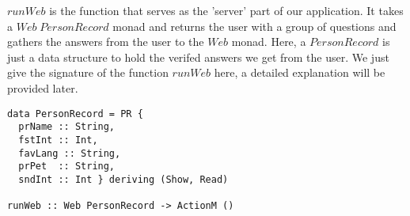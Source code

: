 \documentclass[10pt]{article}
\begin{document}
$runWeb$ is the function that serves as the 'server' part of our application. It takes a $Web\; PersonRecord$ monad and returns the user with a group of questions and gathers the answers from the user to the $Web$ monad. Here, a $PersonRecord$ is just a data structure to hold the verifed answers we get from the user. We just give the signature of the function $runWeb$ here, a detailed explanation will be provided later.
\begin{lstlisting}
data PersonRecord = PR {                                                                                                                                                                      
  prName :: String,                                                                                                                                                                           
  fstInt :: Int,                                                                                                                                                                              
  favLang :: String,                                                                                                                                                                          
  prPet  :: String,                                                                                                                                                                           
  sndInt :: Int } deriving (Show, Read) 
  
runWeb :: Web PersonRecord -> ActionM () 
\end{lstlisting}
\end{document}
